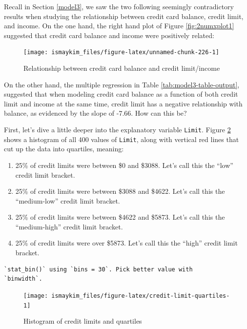 \documentclass[12pt, krantz2,]{krantz}
\providecommand{\tightlist}{%
  \setlength{\itemsep}{0pt}\setlength{\parskip}{0pt}}
\begin{document}
Recall in Section \ref{model3}, we saw the two following seemingly contradictory results when studying the relationship between credit card balance, credit limit, and income. On the one hand, the right hand plot of Figure \ref{fig:2numxplot1} suggested that credit card balance and income were positively related:

\begin{figure}

{\centering \texttt{[image: ismaykim\_files/figure-latex/unnamed-chunk-226-1]} 

}

\caption{Relationship between credit card balance and credit limit/income}\label{fig:unnamed-chunk-226}
\end{figure}

On the other hand, the multiple regression in Table \ref{tab:model3-table-output}, suggested that when modeling credit card balance as a function of both credit limit and income at the same time, credit limit has a negative relationship with balance, as evidenced by the slope of -7.66. How can this be?

First, let's dive a little deeper into the explanatory variable \texttt{Limit}. Figure \ref{fig:credit-limit-quartiles} shows a histogram of all 400 values of \texttt{Limit}, along with vertical red lines that cut up the data into quartiles, meaning:

\begin{enumerate}
\def\labelenumi{\arabic{enumi}.}
\tightlist
\item
  25\% of credit limits were between \$0 and \$3088. Let's call this the ``low'' credit limit bracket.
\item
  25\% of credit limits were between \$3088 and \$4622. Let's call this the ``medium-low'' credit limit bracket.
\item
  25\% of credit limits were between \$4622 and \$5873. Let's call this the ``medium-high'' credit limit bracket.
\item
  25\% of credit limits were over \$5873. Let's call this the ``high'' credit limit bracket.
\end{enumerate}

\begin{verbatim}
`stat_bin()` using `bins = 30`. Pick better value with
`binwidth`.
\end{verbatim}

\begin{figure}

{\centering \texttt{[image: ismaykim\_files/figure-latex/credit-limit-quartiles-1]} 

}

\caption{Histogram of credit limits and quartiles}\label{fig:credit-limit-quartiles}
\end{figure}
\end{document}
